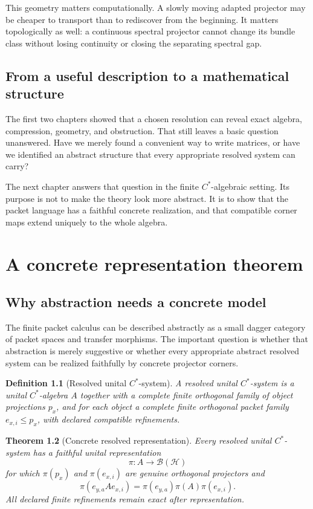 \documentclass[11pt,oneside]{book}
\newtheorem{definition}{Definition}[chapter]
\newtheorem{theorem}[definition]{Theorem}
\theoremstyle{remark}
\begin{document}
This geometry matters computationally.  A slowly moving adapted projector may be cheaper to transport than to rediscover from the beginning.  It matters topologically as well: a continuous spectral projector cannot change its bundle class without losing continuity or closing the separating spectral gap.

\section*{From a useful description to a mathematical structure}
The first two chapters showed that a chosen resolution can reveal exact algebra, compression, geometry, and obstruction.  That still leaves a basic question unanswered.  Have we merely found a convenient way to write matrices, or have we identified an abstract structure that every appropriate resolved system can carry?

The next chapter answers that question in the finite $C^*$-algebraic setting.  Its purpose is not to make the theory look more abstract.  It is to show that the packet language has a faithful concrete realization, and that compatible corner maps extend uniquely to the whole algebra.

\chapter{A concrete representation theorem}

\section{Why abstraction needs a concrete model}
The finite packet calculus can be described abstractly as a small dagger category of packet spaces and transfer morphisms.  The important question is whether that abstraction is merely suggestive or whether every appropriate abstract resolved system can be realized faithfully by concrete projector corners.

\begin{definition}[Resolved unital \(C^*\)-system]
A resolved unital \(C^*\)-system is a unital \(C^*\)-algebra \(A\) together with a complete finite orthogonal family of object projections \(p_x\), and for each object a complete finite orthogonal packet family \(e_{x,i}\le p_x\), with declared compatible refinements.
\end{definition}

\begin{theorem}[Concrete resolved representation]
Every resolved unital \(C^*\)-system has a faithful unital representation
\[
\pi:A\to\mathcal B(\mathcal H)
\]
for which \(\pi(p_x)\) and \(\pi(e_{x,i})\) are genuine orthogonal projectors and
\[
\pi(e_{y,a}Ae_{x,i})
=\pi(e_{y,a})\pi(A)\pi(e_{x,i}).
\]
All declared finite refinements remain exact after representation.
\end{theorem}
\end{document}
